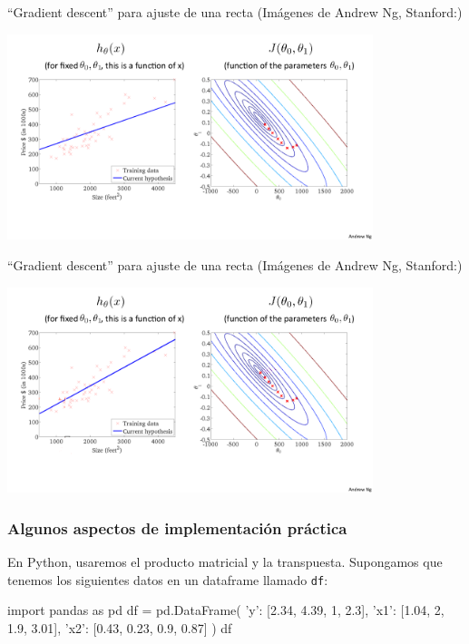 \documentclass[aspectratio=169]{beamer}
\begin{document}
\begin{frame}{``Gradient descent'' para ajuste de una recta  {\scriptsize (Imágenes de Andrew Ng, Stanford:)}}

\begin{center}
  \includegraphics[height=6cm]{ng-gradient8.png}
\end{center}
\end{frame}

\begin{frame}{``Gradient descent'' para ajuste de una recta  {\scriptsize (Imágenes de Andrew Ng, Stanford:)}}

\begin{center}
  \includegraphics[height=6cm]{ng-gradient9.png}
\end{center}
\end{frame}
\begin{frame}[fragile]
\frametitle{Algunos aspectos de implementación práctica}
En Python, usaremos el producto matricial y la transpuesta.
Supongamos que tenemos los siguientes datos en un dataframe llamado {\tt df}:

\begin{pyconsole}
import pandas as pd
df = pd.DataFrame(
   {
       'y': [2.34, 4.39, 1, 2.3],
       'x1': [1.04, 2, 1.9, 3.01],
       'x2': [0.43, 0.23, 0.9, 0.87]
   }
)       
df       
\end{pyconsole}


\end{frame}
\end{document}
